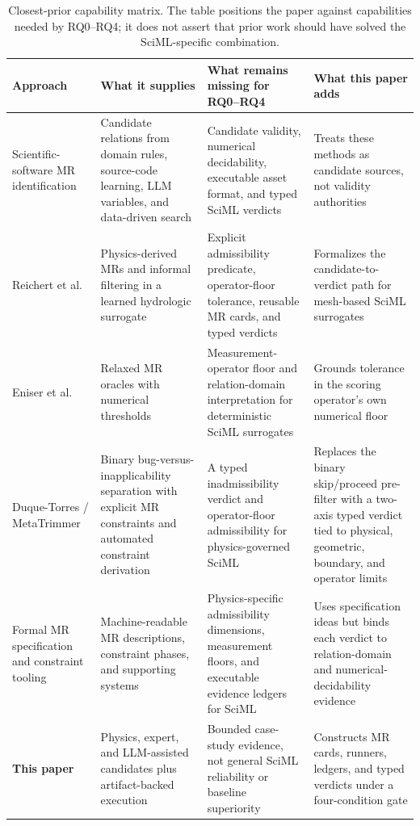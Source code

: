 \documentclass[preprint,12pt]{elsarticle}
\begin{document}
\begin{table}[H]
\centering\footnotesize
\caption{Closest-prior capability matrix. The table positions the paper against capabilities needed by RQ0--RQ4; it does not assert that prior work should have solved the SciML-specific combination.}
\label{tab:closest-prior-positioning}
\renewcommand{\arraystretch}{0.82}
\begin{tabularx}{\textwidth}{@{}>{\raggedright\arraybackslash}p{}YYY@{}}
\toprule
Approach & What it supplies & What remains missing for RQ0--RQ4 & What this paper adds \\
\midrule
Scientific-software MR identification & Candidate relations from domain rules, source-code learning, LLM variables, and data-driven search & Candidate validity, numerical decidability, executable asset format, and typed SciML verdicts & Treats these methods as candidate sources, not validity authorities \\
Reichert et al. & Physics-derived MRs and informal filtering in a learned hydrologic surrogate & Explicit admissibility predicate, operator-floor tolerance, reusable MR cards, and typed verdicts & Formalizes the candidate-to-verdict path for mesh-based SciML surrogates \\
Eniser et al. & Relaxed MR oracles with numerical thresholds & Measurement-operator floor and relation-domain interpretation for deterministic SciML surrogates & Grounds tolerance in the scoring operator's own numerical floor \\
Duque-Torres / MetaTrimmer & Binary bug-versus-inapplicability separation with explicit MR constraints and automated constraint derivation & A typed inadmissibility verdict and operator-floor admissibility for physics-governed SciML & Replaces the binary skip/proceed pre-filter with a two-axis typed verdict tied to physical, geometric, boundary, and operator limits \\
Formal MR specification and constraint tooling & Machine-readable MR descriptions, constraint phases, and supporting systems & Physics-specific admissibility dimensions, measurement floors, and executable evidence ledgers for SciML & Uses specification ideas but binds each verdict to relation-domain and numerical-decidability evidence \\
\textbf{This paper} & Physics, expert, and LLM-assisted candidates plus artifact-backed execution & Bounded case-study evidence, not general SciML reliability or baseline superiority & Constructs MR cards, runners, ledgers, and typed verdicts under a four-condition gate \\
\bottomrule
\end{tabularx}
\end{table}
\end{document}

